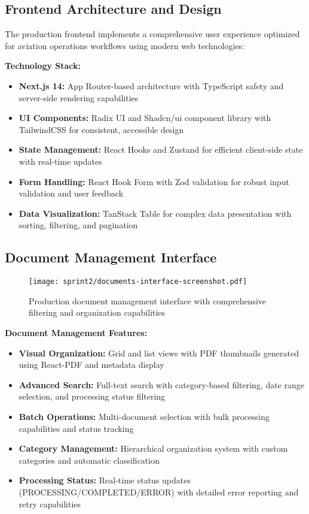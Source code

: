 \subsection{Frontend Architecture and Design}
\label{subsec:frontend_architecture_s3}

The production frontend implements a comprehensive user experience optimized for aviation operations workflows using modern web technologies:

\textbf{Technology Stack:}
\begin{itemize}
    \item \textbf{Next.js 14:} App Router-based architecture with TypeScript safety and server-side rendering capabilities
    \item \textbf{UI Components:} Radix UI and Shadcn/ui component library with TailwindCSS for consistent, accessible design
    \item \textbf{State Management:} React Hooks and Zustand for efficient client-side state with real-time updates
    \item \textbf{Form Handling:} React Hook Form with Zod validation for robust input validation and user feedback
    \item \textbf{Data Visualization:} TanStack Table for complex data presentation with sorting, filtering, and pagination
\end{itemize}

\subsection{Document Management Interface}
\label{subsec:document_management_s3}

\begin{figure}[H]
    \centering
    \texttt{[image: sprint2/documents-interface-screenshot.pdf]}
    \caption{Production document management interface with comprehensive filtering and organization capabilities}
    \label{fig:documents_interface_s3}
\end{figure}

\textbf{Document Management Features:}
\begin{itemize}
    \item \textbf{Visual Organization:} Grid and list views with PDF thumbnails generated using React-PDF and metadata display
    \item \textbf{Advanced Search:} Full-text search with category-based filtering, date range selection, and processing status filtering
    \item \textbf{Batch Operations:} Multi-document selection with bulk processing capabilities and status tracking
    \item \textbf{Category Management:} Hierarchical organization system with custom categories and automatic classification
    \item \textbf{Processing Status:} Real-time status updates (PROCESSING/COMPLETED/ERROR) with detailed error reporting and retry capabilities
\end{itemize}

